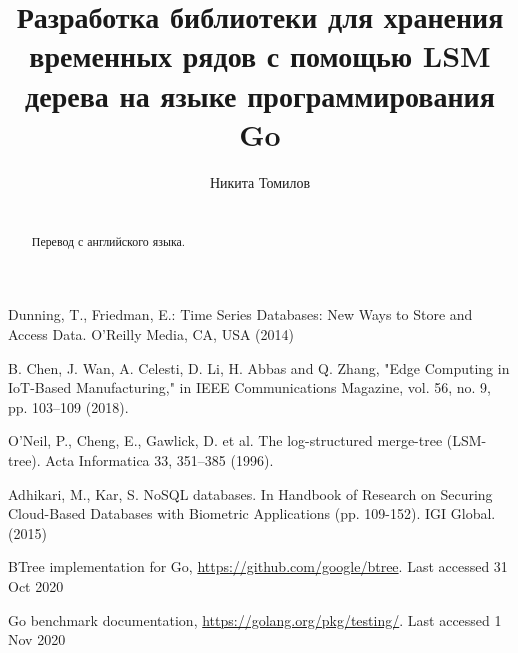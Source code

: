 \documentclass[runningheads]{llncs}
\begin{document}
%
\title{Разработка библиотеки для хранения временных рядов с помощью LSM дерева на языке
	программирования Go}
%
%
\author{Никита Томилов}
%
%
%
\maketitle              %
%
\begin{abstract}


\\
Перевод с английского языка.
\end{abstract}
%
%
%




%
%
%
% 
% 
%
\begin{thebibliography}{8}
Dunning, T., Friedman, E.: Time Series Databases: New Ways to Store and Access Data. O'Reilly Media, CA, USA  (2014)

B. Chen, J. Wan, A. Celesti, D. Li, H. Abbas and Q. Zhang, "Edge Computing in IoT-Based Manufacturing," in IEEE Communications Magazine, vol. 56, no. 9, pp. 103--109 (2018). 

O’Neil, P., Cheng, E., Gawlick, D. et al. The log-structured merge-tree (LSM-tree). Acta Informatica 33, 351--385 (1996). 

Adhikari, M., Kar, S. NoSQL databases. In Handbook of Research on Securing Cloud-Based Databases with Biometric Applications (pp. 109-152). IGI Global. (2015)

BTree implementation for Go, \url{https://github.com/google/btree}. Last accessed 31
Oct 2020

Go benchmark documentation, \url{https://golang.org/pkg/testing/}. Last accessed 1
Nov 2020

\end{thebibliography}
\end{document}
